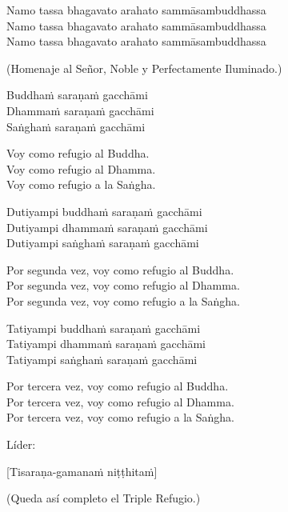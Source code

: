 Namo tassa bhagavato arahato sammāsambuddhassa\\
Namo tassa bhagavato arahato sammāsambuddhassa\\
Namo tassa bhagavato arahato sammāsambuddhassa

\begin{english}
  (Homenaje al Señor, Noble y Perfectamente Iluminado.)\\
\end{english}

Buddhaṁ saraṇaṁ gacchāmi\\
Dhammaṁ saraṇaṁ gacchāmi\\
Saṅghaṁ saraṇaṁ gacchāmi

\begin{english}
  Voy como refugio al Buddha.\\
  Voy como refugio al Dhamma.\\
  Voy como refugio a la Saṅgha.
\end{english}

Dutiyampi buddhaṁ saraṇaṁ gacchāmi\\
Dutiyampi dhammaṁ saraṇaṁ gacchāmi\\
Dutiyampi saṅghaṁ saraṇaṁ gacchāmi

\begin{english}
  Por segunda vez, voy como refugio al Buddha.\\
  Por segunda vez, voy como refugio al Dhamma.\\
  Por segunda vez, voy como refugio a la Saṅgha.
\end{english}

Tatiyampi buddhaṁ saraṇaṁ gacchāmi\\
Tatiyampi dhammaṁ saraṇaṁ gacchāmi\\
Tatiyampi saṅghaṁ saraṇaṁ gacchāmi

\clearpage

\begin{english}
  Por tercera vez, voy como refugio al Buddha.\\
  Por tercera vez, voy como refugio al Dhamma.\\
  Por tercera vez, voy como refugio a la Saṅgha.
 \end{english}

\begin{instruction}
  Líder:
\end{instruction}

[Tisaraṇa-gamanaṁ niṭṭhitaṁ]

\begin{english}
  (Queda así completo el Triple Refugio.)
\end{english}

